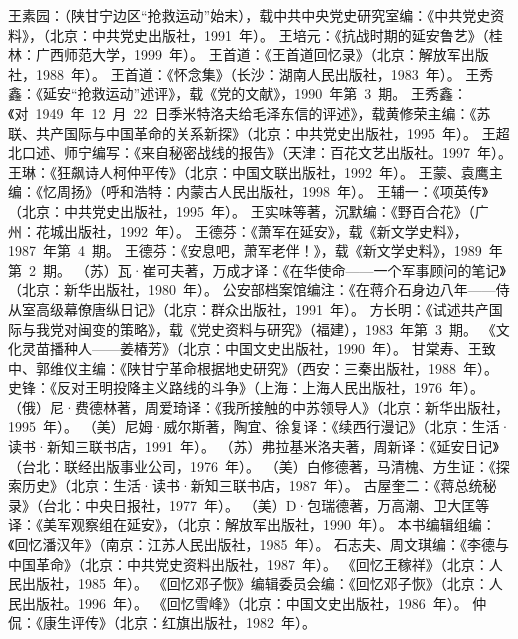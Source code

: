 \begin{thebibliography}{999}
\bibitem{}王素园：（陕甘宁边区“抢救运动”始末），载中共中央党史研究室编：《中共党史资料》，（北京：中共党史出版社，1991~年）。
\bibitem{}王培元：《抗战时期的延安鲁艺》（桂林：广西师范大学，1999~年）。
\bibitem{}王首道：《王首道回忆录》（北京：解放军出版社，1988~年）。
\bibitem{}王首道：《怀念集》（长沙：湖南人民出版社，1983~年）。
\bibitem{}王秀鑫：《延安“抢救运动”述评》，载《党的文献》，1990~年第~3~期。
\bibitem{}王秀鑫：《对~1949~年~12~月~22~日季米特洛夫给毛泽东信的评述》，载黄修荣主编：《苏联、共产国际与中国革命的关系新探》（北京：中共党史出版社，1995~年）。
\bibitem{}王超北口述、师宁编写：《来自秘密战线的报告》（天津：百花文艺出版社。1997~年）。
\bibitem{}王琳：《狂飙诗人柯仲平传》（北京：中国文联出版社，1992~年）。
\bibitem{}王蒙、袁鹰主编：《忆周扬》（呼和浩特：内蒙古人民出版社，1998~年）。
\bibitem{}王辅一：《项英传》（北京：中共党史出版社，1995~年）。
\bibitem{}王实味等著，沉默编：《野百合花》（广州：花城出版社，1992~年）。
\bibitem{}王德芬：《萧军在延安》，载《新文学史料》，1987~年第~4~期。
\bibitem{}王德芬：《安息吧，萧军老伴！》，载《新文学史料》，1989~年第~2~期。
\bibitem{}（苏）瓦·崔可夫著，万成才译：《在华使命——一个军事顾问的笔记》（北京：新华出版社，1980~年）。
\bibitem{}公安部档案馆编注：《在蒋介石身边八年——侍从室高级幕僚唐纵日记》（北京：群众出版社，1991~年）。
\bibitem{}方长明：《试述共产国际与我党对闽变的策略》，载《党史资料与研究》（福建），1983~年第~3~期。
\bibitem{}《文化灵苗播种人——姜椿芳》（北京：中国文史出版社，1990~年）。
\bibitem{}甘棠寿、王致中、郭维仪主编：《陕甘宁革命根据地史研究》（西安：三秦出版社，1988~年）。
\bibitem{}史锋：《反对王明投降主义路线的斗争》（上海：上海人民出版社，1976~年）。
\bibitem{}（俄）尼·费德林著，周爱琦译：《我所接触的中苏领导人》（北京：新华出版社，1995~年）。
\bibitem{}（美）尼姆·威尔斯著，陶宜、徐复译：《续西行漫记》（北京：生活·读书·新知三联书店，1991~年）。
\bibitem{}（苏）弗拉基米洛夫著，周新译：《延安日记》（台北：联经出版事业公司，1976~年）。
\bibitem{}（美）白修德著，马清槐、方生证：《探索历史》（北京：生活·读书·新知三联书店，1987~年）。
\bibitem{}古屋奎二：《蒋总统秘录》（台北：中央日报社，1977~年）。
\bibitem{}（美）D·包瑞德著，万高潮、卫大匡等译：《美军观察组在延安》，（北京：解放军出版社，1990~年）。
\bibitem{}本书编辑组编：《回忆潘汉年》（南京：江苏人民出版社，1985~年）。
\bibitem{}石志夫、周文琪编：《李德与中国革命》（北京：中共党史资料出版社，1987~年）。
\bibitem{}《回忆王稼祥》（北京：人民出版社，1985~年）。
\bibitem{}《回忆邓子恢》编辑委员会编：《回忆邓子恢》（北京：人民出版社。1996~年）。
\bibitem{}《回忆雪峰》（北京：中国文史出版社，1986~年）。
\bibitem{}仲侃：《康生评传》（北京：红旗出版社，1982~年）。

\end{thebibliography}
